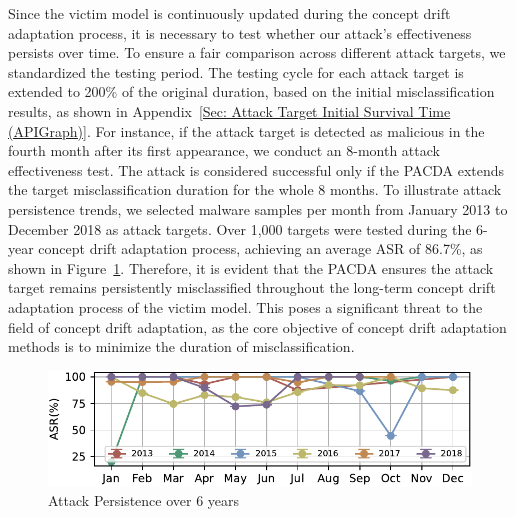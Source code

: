 \documentclass[conference,compsoc]{IEEEtran} %
\begin{document}
Since the victim model is continuously updated during the concept drift adaptation process, it is necessary to test whether our attack's effectiveness persists over time.
To ensure a fair comparison across different attack targets, we standardized the testing period.
The testing cycle for each attack target is extended to 200\% of the original duration, based on the initial misclassification results, as shown in Appendix~\ref{Sec: Attack Target Initial Survival Time (APIGraph)}.
For instance, if the attack target is detected as malicious in the fourth month after its first appearance, we conduct an 8-month attack effectiveness test.
The attack is considered successful only if the PACDA extends the target  misclassification duration for the whole 8 months.
To illustrate attack persistence trends, we selected malware samples per month from January 2013 to December 2018 as attack targets.
Over 1,000 targets were tested during the 6-year concept drift adaptation process, achieving an average ASR of 86.7\%, as shown in Figure~\ref{fig:Attack Persistence-APIGraph}.
Therefore, it is evident that the PACDA ensures the attack target remains persistently misclassified throughout the long-term concept drift adaptation process of the victim model.
This poses a significant threat to the field of concept drift adaptation, as the core objective of concept drift adaptation methods is to minimize the duration of misclassification.
\begin{figure}[h!]
	\centering
	\includegraphics[width=\linewidth,keepaspectratio]{Graph/Evaluation/Figure9.pdf}
	\caption{Attack Persistence over 6 years }
	\label{fig:Attack Persistence-APIGraph}
\end{figure}
\end{document}
